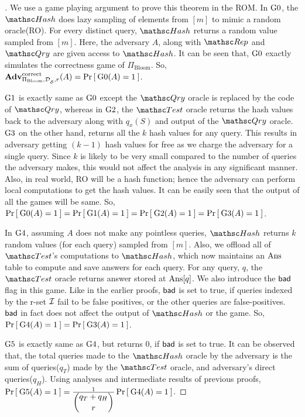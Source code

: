 \begin{proof}[]
We use a game playing argument to prove this theorem in the ROM. In $\text{G0}$, the $\Hash$ does lazy sampling of elements from $[m]$ to mimic a random oracle(RO). For every distinct query, $\Hash$ returns a random value sampled from $[m]$. Here, the adversary $A$, along with $\Rep$ and $\Qry$ are given access to $\Hash$. It can be seen that, $\text{G0}$ exactly simulates the correctness game of $\Pi_{\mathrm{Bloom}}$. So, $\mathrm{\mathbf{Adv}}^{\mathrm{correct}}_{\Pi_{\mathrm{Bloom}},\mathcal{D}_{{\cal S}}^{},r}(A) = \Pr\left[\: \text{G0}(A) = 1 \:\right]$.

$\text{G1}$ is exactly same as $\text{G0}$ except the $\Qry$ oracle is replaced by the code of $\Qry$, whereas in $\text{G2}$, the $\Test$ oracle returns the hash values back to the adversary along with $q_x(S)$ and output of the $\Qry$ oracle. $\text{G3}$ on the other hand, returns all the $k$ hash values for any query. This results in adversary getting $(k-1)$ hash values for free as we charge the adversary for a single query. Since $k$ is likely to be very small compared to the number of queries the adversary makes, this would not affect the analysis in any significant manner. Also, in real world, RO will be a hash function; hence the adversary can perform local computations to get the hash values. It can be easily seen that the output of all the games will be same. So, $\Pr\left[\: \text{G0}(A) = 1 \:\right] = \Pr\left[\: \text{G1}(A) = 1 \:\right] = \Pr\left[\: \text{G2}(A) = 1 \:\right] = \Pr\left[\: \text{G3}(A) = 1 \:\right]$. 

In $\text{G4}$, assuming $A$ does not make any pointless queries, $\Hash$ returns $k$ random values (for each query) sampled from $[m]$. Also, we offload all of $\Test$'s computations to $\Hash$, which now maintains an $\mathrm{Ans}$ table to compute and save answers for each query.  For any query, $q$, the $\Test$ oracle returns answer stored at $\mathrm{Ans}[q]$. We also introduce the $\mathsf{bad}$ flag in this game. Like in the earlier proofs,  $\mathsf{bad}$ is set to true, if queries indexed by the r-set ${\cal I}$ fail to be false positives, or the other queries are false-positives. $\mathsf{bad}$ in fact does not affect the output of $\Hash$ or the game. So, $\Pr\left[\: \text{G4}(A) = 1 \:\right] = \Pr\left[\: \text{G3}(A) = 1 \:\right]$. 

$\text{G5}$ is exactly same as $\text{G4}$, but returns 0, if $\mathsf{bad}$ is set to true. It can be observed that, the total queries made to the $\Hash$ oracle by the adversary is the sum of queries($q_T$) made by the $\Test$ oracle, and adversary's direct queries($q_H$). Using analyses and intermediate results of previous proofs, $\Pr\left[\: \text{G5}(A)=1 \:\right] = \frac{1}{\dbinom{q_T + q_H}{r}}\Pr\left[\: \text{G4}(A)=1 \:\right]$.


\end{proof}

